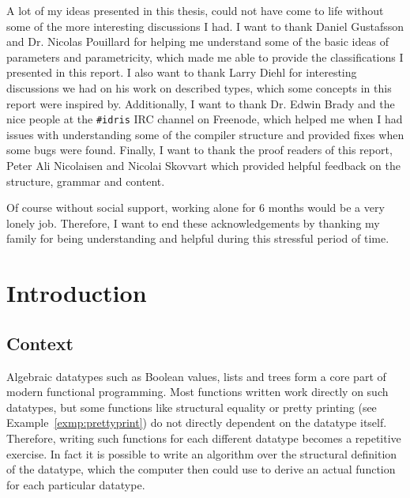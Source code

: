 \documentclass{ituthesis}
\theoremstyle{break}
\begin{document}
A lot of my ideas presented in this thesis, could not have come to life without some of the more interesting discussions I had.
I want to thank Daniel Gustafsson and Dr. Nicolas Pouillard for helping me understand some of the basic ideas of parameters and parametricity, which made me able to provide the classifications I presented in this report.
I also want to thank Larry Diehl for interesting discussions we had on his work on described types, which some concepts in this report were inspired by.
Additionally, I want to thank Dr. Edwin Brady and the nice people at the \texttt{\#idris} IRC channel on Freenode, which helped me when I had issues with understanding some of the compiler structure and provided fixes when some bugs were found.
Finally, I want to thank the proof readers of this report, Peter Ali Nicolaisen and Nicolai Skovvart which provided helpful feedback on the structure, grammar and content.

Of course without social support, working alone for 6 months would be a very lonely job.
Therefore, I want to end these acknowledgements by thanking my family for being understanding and helpful during this stressful period of time.



\cleardoublepage
\setcounter{tocdepth}{1}
\tableofcontents
\newpage
\listoffigures

\mainmatter
\midsloppy
\sloppybottom
\chapter{Introduction}
\label{cha:Intoduction}
\section{Context}
\label{sec:Context}
Algebraic datatypes such as Boolean values, lists and trees form a core part of modern functional programming.
Most functions written work directly on such datatypes, but some functions like structural equality or pretty printing (see Example~\ref{exmp:prettyprint}) do not directly dependent on the datatype itself.
Therefore, writing such functions for each different datatype becomes a repetitive exercise.
In fact it is possible to write an algorithm over the structural definition of the datatype, which the computer then could use to derive an actual function for each particular datatype.
\end{document}
